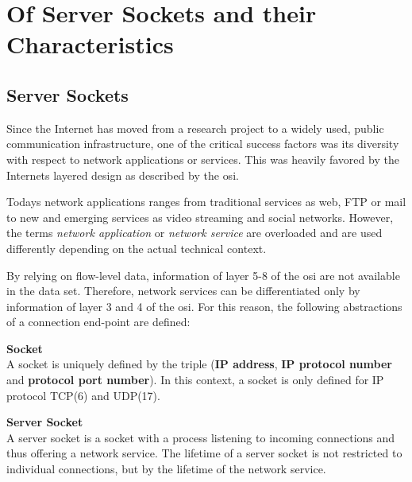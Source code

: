 

\chapter{Of Server Sockets and their Characteristics 
\label{chapter:sockets}}

\section{Server Sockets} Since the Internet has moved from a research project to a widely used, public communication infrastructure, one of the critical success factors was its diversity with respect to network applications or services. This was heavily favored by the Internets layered design as described by the \gls{osi}. 

Todays network applications ranges from traditional services as web, \gls{FTP} 
or mail to new and emerging services as video streaming and social networks. 
However, the terms \emph{network application} or \emph{network service} are 
overloaded and are used differently depending on the actual technical context.

By relying on flow-level data, information of layer 5-8 of the \gls{osi} are not available in the data set. Therefore, network services can be differentiated only by information of layer 3 and 4 of the \gls{osi}. For this reason, the following abstractions of a connection end-point are defined:
\parbox{ 
\textwidth}{ 
\begin{defn}
	{\textbf{Socket}\\} A socket is uniquely defined by the triple (\textbf{IP address}, \textbf{IP protocol number} and \textbf{protocol port number}). In this context, a socket is only defined for IP protocol \gls{TCP}(6) and \gls{UDP}(17). 
\end{defn}
}
\parbox{ 
\textwidth}{ 
\begin{defn}
	{\textbf{Server Socket 
	\label{def:serversocket}}\\} A server socket is a socket with a process listening to incoming connections and thus offering a network service. The lifetime of a server socket is not restricted to individual connections, but by the lifetime of the network service. 
\end{defn}
}

